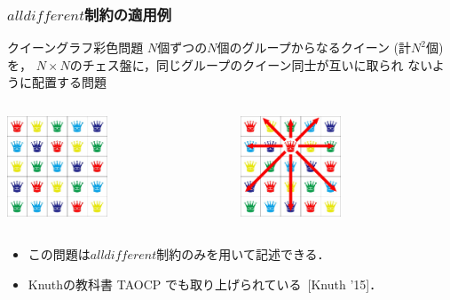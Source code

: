 \documentclass [dvipdfmx,11pt]{beamer}
\newcommand{\alldifferent}{$alldifferent$}
\begin{document}
\begin{frame}
  \frametitle{{\alldifferent}制約の適用例}
  \begin{block}{クイーングラフ彩色問題}
    $N$個ずつの$N$個のグループからなるクイーン (計$N^2$個) を，
    $N\times N$のチェス盤に，同じグループのクイーン同士が互いに取られ
    ないように配置する問題
  \end{block}
  \begin{exampleblock}{}\centering
    \begin{columns}
      \begin{column}{0.45\textwidth}\centering
        \includegraphics[width=3cm]{images/qgcp_5.jpg}
      \end{column}
      \begin{column}{0.45\textwidth}\centering
        \includegraphics[width=3cm]{images/qgcp_5_c.jpg}
      \end{column}
    \end{columns}
  \end{exampleblock}
  \begin{itemize}
  \item この問題は{\alldifferent}制約のみを用いて記述できる．
  \item Knuthの教科書 TAOCP でも取り上げられている~[Knuth '15]．
  \end{itemize}
\end{frame}
\end{document}
